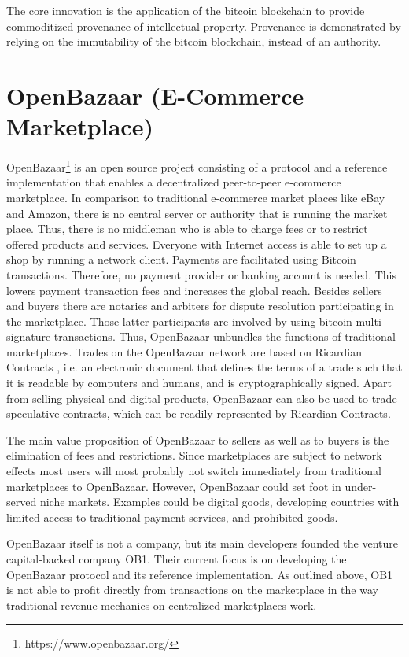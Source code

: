 The core innovation is the application of the bitcoin blockchain to provide commoditized 
provenance of intellectual property. Provenance is demonstrated by relying on the 
immutability of the bitcoin blockchain, instead of an authority. 

\section{OpenBazaar (E-Commerce Marketplace)}
\label{sec:ecobazaar}

OpenBazaar\footnote{https://www.openbazaar.org/} is an open source project consisting of a protocol and a reference 
implementation that enables a decentralized peer-to-peer e-commerce marketplace. 
In comparison to traditional e-commerce market places like eBay and Amazon, there 
is no central server or authority that is running the market place. Thus, there 
is no middleman who is able to charge fees or to restrict offered products and 
services. Everyone with Internet access is able to set up a shop by running a network 
client. Payments are facilitated using Bitcoin transactions. Therefore, no payment 
provider or banking account is needed. This lowers payment transaction fees and 
increases the global reach. Besides sellers and buyers there are notaries and arbiters 
for dispute resolution participating in the marketplace. Those latter participants 
are involved by using bitcoin multi-signature transactions. Thus, OpenBazaar unbundles 
the functions of traditional marketplaces. Trades on the OpenBazaar network are 
based on Ricardian Contracts \parencite{1319505}, i.e. an electronic document that defines 
the terms of a trade such that it is readable by computers and humans, and is cryptographically 
signed. Apart from selling physical and digital products, OpenBazaar can also be 
used to trade speculative contracts, which can be readily represented by Ricardian 
Contracts. 

The main value proposition of OpenBazaar to sellers as well as to buyers is the 
elimination of fees and restrictions. Since marketplaces are subject to network 
effects most users will most probably not switch immediately from traditional marketplaces 
to OpenBazaar. However, OpenBazaar could set foot in under-served niche markets. 
Examples could be digital goods, developing countries with limited access to traditional 
payment services, and prohibited goods. 

OpenBazaar itself is not a company, but its main developers founded the venture 
capital-backed company OB1. Their current focus is on developing the OpenBazaar 
protocol and its reference implementation. As outlined above, OB1 is not able to 
profit directly from transactions on the marketplace in the way traditional revenue 
mechanics on centralized marketplaces work. 

